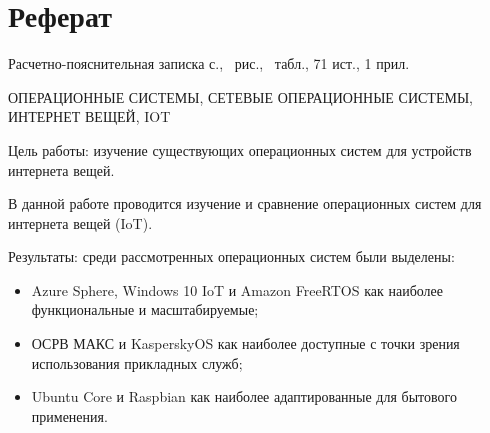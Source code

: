 \section*{Реферат}

Расчетно-пояснительная записка \pageref{LastPage} с., \totalfigures\ рис., \totaltables\ табл., 71 ист., 1 прил.

ОПЕРАЦИОННЫЕ СИСТЕМЫ, СЕТЕВЫЕ ОПЕРАЦИОННЫЕ СИСТЕМЫ, ИНТЕРНЕТ ВЕЩЕЙ, IOT

Цель работы: изучение существующих операционных систем для устройств интернета вещей.

В данной работе проводится изучение и сравнение операционных систем для интернета вещей (IoT).

Результаты: среди рассмотренных операционных систем были выделены:

\begin{itemize}
	\item Azure Sphere, Windows 10 IoT и Amazon FreeRTOS как наиболее функциональные и масштабируемые;
	\item ОСРВ МАКС и KasperskyOS как наиболее доступные с точки зрения использования прикладных служб;
	\item Ubuntu Core и Raspbian как наиболее адаптированные для бытового применения.
\end{itemize}

\pagebreak